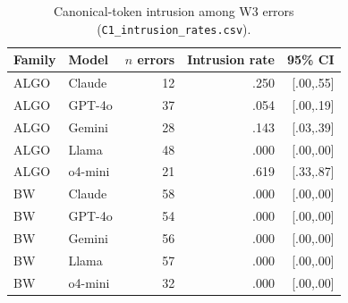 \begin{table}[t]
\centering
\small
\caption{Canonical-token intrusion among W3 errors
(\texttt{C1\_intrusion\_rates.csv}).}
\label{tab:c1-intrusion}
\begin{tabular}{llrrr}
\toprule
Family & Model & $n$ errors & Intrusion rate & 95\% CI \\
\midrule
ALGO & Claude & 12 & .250 & [.00,.55] \\
ALGO & GPT-4o & 37 & .054 & [.00,.19] \\
ALGO & Gemini & 28 & .143 & [.03,.39] \\
ALGO & Llama & 48 & .000 & [.00,.00] \\
ALGO & o4-mini & 21 & .619 & [.33,.87] \\
BW & Claude & 58 & .000 & [.00,.00] \\
BW & GPT-4o & 54 & .000 & [.00,.00] \\
BW & Gemini & 56 & .000 & [.00,.00] \\
BW & Llama & 57 & .000 & [.00,.00] \\
BW & o4-mini & 32 & .000 & [.00,.00] \\
\bottomrule
\end{tabular}
\end{table}

